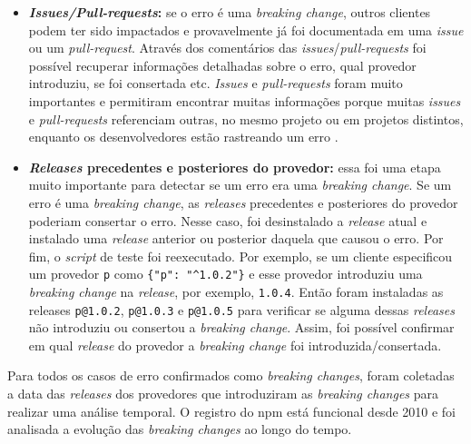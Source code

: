 \begin{itemize}
    \item \textbf{\textit{Issues/Pull-requests}:} se o erro é uma \textit{breaking change}, outros clientes podem ter sido impactados e provavelmente já foi documentada em uma \textit{issue} ou um \textit{pull-request}. Através dos comentários das \textit{issues}/\textit{pull-requests} foi possível recuperar informações detalhadas sobre o erro, qual provedor introduziu, se foi consertada etc. \textit{Issues} e \textit{pull-requests} foram muito importantes e permitiram encontrar muitas informações porque muitas \textit{issues} e \textit{pull-requests} referenciam outras, no mesmo projeto ou em projetos distintos, enquanto os desenvolvedores estão rastreando um erro \cite{Zhang:2018:WIL:3242887.3242891}.

    \item \textbf{\textit{Releases} precedentes e posteriores do provedor:} essa foi uma etapa muito importante para detectar se um erro era uma \textit{breaking change}. Se um erro é uma \textit{breaking change}, as \textit{releases} precedentes e posteriores do provedor poderiam consertar o erro. Nesse caso, foi desinstalado a \textit{release} atual e instalado uma \textit{release} anterior ou posterior daquela que causou o erro. Por fim, o \textit{script} de teste foi reexecutado. Por exemplo, se um cliente especificou um provedor \texttt{p} como \texttt{\{"p": "\textasciicircum1.0.2"\}} e esse provedor introduziu uma \textit{breaking change} na \textit{release}, por exemplo, \texttt{1.0.4}. Então foram instaladas as releases \texttt{p@1.0.2}, \texttt{p@1.0.3} e \texttt{p@1.0.5} para verificar se alguma dessas \textit{releases} não introduziu ou consertou a \textit{breaking change}. Assim, foi possível confirmar em qual \textit{release} do provedor a \textit{breaking change} foi introduzida/consertada.
\end{itemize}{}

Para todos os casos de erro confirmados como \textit{breaking changes}, foram coletadas a data das \textit{releases} dos provedores que introduziram as \textit{breaking changes} para realizar uma análise temporal. O registro do \textsf{npm} está funcional desde 2010 e foi analisada a evolução das \textit{breaking changes} ao longo do tempo.

